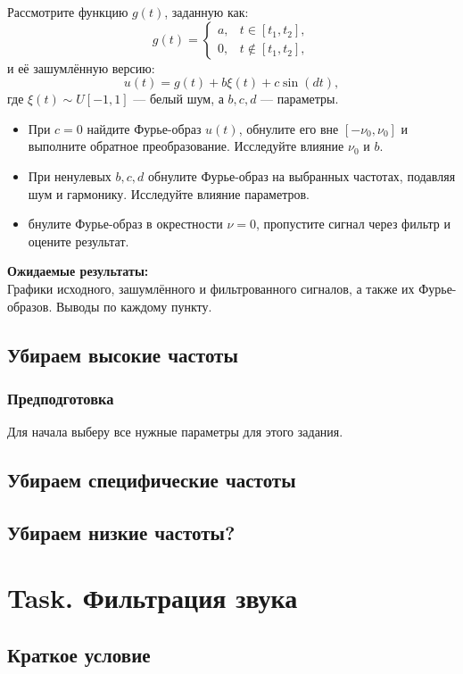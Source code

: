 \documentclass[a4paper,12pt]{article}
\begin{document}
Рассмотрите функцию \( g(t) \), заданную как:
\[
g(t) = 
\begin{cases} 
a, & t \in [t_1, t_2], \\
0, & t \notin [t_1, t_2],
\end{cases}
\]
и её зашумлённую версию:
\[
u(t) = g(t) + b\xi(t) + c \sin(dt),
\]
где \(\xi(t) \sim U[-1, 1]\) — белый шум, а \( b, c, d \) — параметры.

\begin{itemize}
\item При \( c = 0 \) найдите Фурье-образ \( u(t) \), обнулите его вне \([- \nu_0, \nu_0]\) и выполните обратное преобразование. Исследуйте влияние \( \nu_0 \) и \( b \).

\item При ненулевых \( b, c, d \) обнулите Фурье-образ на выбранных частотах, подавляя шум и гармонику. Исследуйте влияние параметров.

\item бнулите Фурье-образ в окрестности \( \nu = 0 \), пропустите сигнал через фильтр и оцените результат.
\end{itemize}
\textbf{Ожидаемые результаты:} \\
Графики исходного, зашумлённого и фильтрованного сигналов, а также их Фурье-образов. Выводы по каждому пункту.

\subsection{Убираем высокие частоты}
\subsubsection{Предподготовка}
Для начала выберу все нужные параметры для этого задания.






\subsection{Убираем специфические частоты}
\subsection{Убираем низкие частоты?}




\section{Task. Фильтрация звука}
\subsection{Краткое условие}
\end{document}
